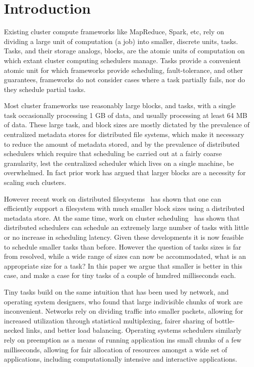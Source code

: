 \section{Introduction}
Existing cluster compute frameworks like MapReduce, Spark, etc, rely on dividing a large unit of computation (a job)
into smaller, discrete units, \ie tasks. Tasks, and their storage analogs, blocks, are the atomic units of computation
on which extant cluster computing schedulers manage. Tasks provide a convenient atomic unit for which frameworks
provide scheduling, fault-tolerance, and other guarantees, \ie frameworks do not consider cases where a task partially
fails, nor do they schedule partial tasks. 

Most cluster frameworks use reasonably large blocks, and tasks, with a single task occasionally processing 1 GB of
data, and usually processing at least 64 MB of data. These large task, and block sizes are mostly dictated by the
prevalence of centralized metadata stores for distributed file systems, which make it necessary to reduce the amount of
metadata stored, and by the prevalence of distributed schedulers which require that scheduling be carried out at a
fairly coarse granularity, lest the centralized scheduler which lives on a single machine, be overwhelmed. In fact
prior work  has argued that larger
blocks are a necessity for scaling such clusters.

However recent work on distributed filesystems~\cite{nightingale2012flat} has shown that one can efficiently
support a filesystem with much smaller block sizes using a distributed metadata store. At the same time, work on cluster
scheduling~ has shown that distributed schedulers can schedule an extremely large number of
tasks with little or no increase in scheduling latency. Given these developments it is now feasible to schedule smaller
tasks than before. However the question of tasks sizes is far from resolved, while a wide range of sizes can now be accommodated,
what is an appropriate size for a task? In this paper we argue that smaller is better in this case, and make a case for
tiny tasks of a couple of hundred milliseconds each.

Tiny tasks build on the same intuition that has been used by network, and operating system designers, who found that
large indivisible chunks of work are inconvenient. Networks rely on dividing traffic into smaller packets, allowing for
increased utilization through statistical multiplexing, fairer sharing of bottle-necked links, and better load
balancing. Operating systems schedulers similarly rely on preemption as a means of running application ins small chunks
of a few milliseconds, allowing for fair allocation of resources amongst a wide
set of applications, including computationally intensive and interactive applications.

